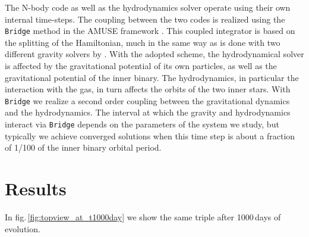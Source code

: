 \documentclass{aastex62}
\begin{document}
The N-body code as well as the hydrodynamics solver operate using
their own internal time-steps. The coupling between the two codes is
realized using the \texttt{Bridge} method in the AMUSE framework
\citep[see Sect.\.4.3.1 in][]{2013CoPhC.183..456P}.  This coupled
integrator is based on the splitting of the Hamiltonian, much in the
same way as is done with two different gravity solvers by
\cite{2007PASJ...59.1095F}. With the adopted scheme, the
hydrodynamical solver is affected by the gravitational potential of
its own particles, as well as the gravitational potential of the inner
binary. The hydrodynamics, in particular the interaction with the gas,
in turn affects the orbits of the two inner stars. With
\texttt{Bridge} we realize a second order coupling between the
gravitational dynamics and the hydrodynamics.  The interval at which
the gravity and hydrodynamics interact via \texttt{Bridge} depends on
the parameters of the system we study, but typically we achieve
converged solutions when this time step is about a fraction of 1/100
of the inner binary orbital period.

\section{Results} \label{results}

In fig.\,\ref{fig:topview_at_t1000day} we show the same triple after
1000\,days of evolution.

\cite{2018arXiv181208175M}
\end{document}
